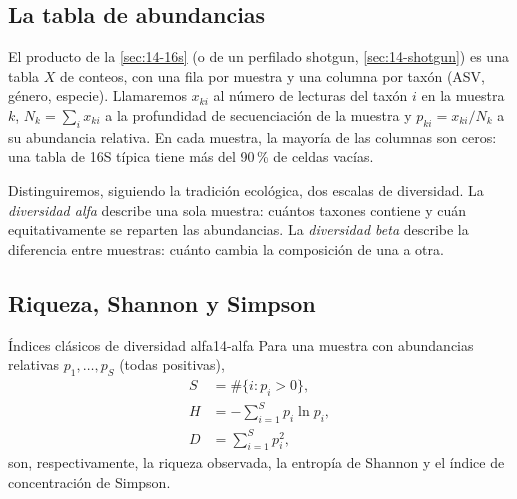\subsection{La tabla de abundancias}

El producto de la \cref{sec:14-16s} (o de un perfilado shotgun, \cref{sec:14-shotgun}) es una tabla $X$ de conteos, con una fila por muestra y una columna por taxón (ASV, género, especie). Llamaremos $x_{ki}$ al número de lecturas del taxón $i$ en la muestra $k$, $N_k = \sum_i x_{ki}$ a la profundidad de secuenciación de la muestra y $p_{ki} = x_{ki}/N_k$ a su abundancia relativa. En cada muestra, la mayoría de las columnas son ceros: una tabla de 16S típica tiene más del 90\,\% de celdas vacías.

Distinguiremos, siguiendo la tradición ecológica, dos escalas de diversidad. La \emph{diversidad alfa} describe una sola muestra: cuántos taxones contiene y cuán equitativamente se reparten las abundancias. La \emph{diversidad beta} describe la diferencia entre muestras: cuánto cambia la composición de una a otra.

\subsection{Riqueza, Shannon y Simpson}

\begin{definicion}{Índices clásicos de diversidad alfa}{14-alfa}
Para una muestra con abundancias relativas $p_1,\dots,p_S$ (todas positivas),
\begin{align}
S &= \#\{i : p_i > 0\}, \label{eq:14-riqueza}\\
H &= -\sum_{i=1}^{S} p_i \ln p_i, \label{eq:14-shannon}\\
D &= \sum_{i=1}^{S} p_i^2, \label{eq:14-simpson}
\end{align}
son, respectivamente, la riqueza observada, la entropía de Shannon y el índice de concentración de Simpson.
\end{definicion}

\begin{simbolos}
\end{simbolos}

